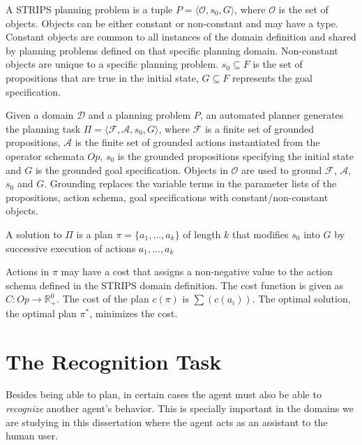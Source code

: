 \begin{definition}
A STRIPS planning problem is a tuple $P = \langle \mathcal{O}, s_0, G\rangle$, where $\mathcal{O}$ is the set of objects. Objects can be either constant or non-constant and may have a type. Constant objects are common to all instances of the domain definition and shared by planning problems defined on that specific planning domain. Non-constant objects are unique to a specific planning problem. $s_0 \subseteq F$ is the set of propositions that are true in the initial state, $G\subseteq F$ represents the goal specification.
\end{definition}

Given a domain $\mathcal{D}$ and a planning problem $P$, an automated planner generates the planning task $\Pi=\langle \mathcal{F}, \mathcal{A}, s_0, G\rangle$, where $\mathcal{F}$ is a finite set of grounded propositions, $\mathcal{A}$ is the finite set of grounded actions instantiated from the operator schemata $Op$, $s_0$ is the grounded propositions specifying the initial state and $G$ is the grounded goal specification. Objects in $\mathcal{O}$ are used to ground $\mathcal{F}$, $\mathcal{A}$, $s_0$ and $G$. Grounding replaces the variable terms in the parameter lists of the propositions, action schema, goal specifications with constant/non-constant objects. 

\begin{definition}
A solution to $\Pi$ is a plan $\pi=\lbrace a_1, \ldots, a_k\rbrace$ of length $k$ that modifies $s_0$ into $G$ by successive execution of actions  $a_1, \ldots, a_k$ 
\end{definition}

Actions in $\pi$ may have a cost that assigns a non-negative value to the action schema defined in the STRIPS domain definition. The cost function is given as $C: Op \rightarrow \mathbb{R}^0_+$. The cost of the plan $c(\pi)$ is  $\sum(c(a_i))$. The optimal solution, the optimal plan $\pi^*$, minimizes the cost. 



\section{The Recognition Task}
Besides being able to plan, in certain cases the agent must also be able to \textit{recognize} another agent's behavior. This is specially important in the domains we are studying in this dissertation where the agent acts as an assistant to the human user.

